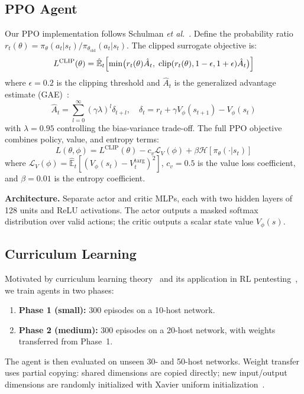 \documentclass[conference]{IEEEtran}
\begin{document}
\subsection{PPO Agent}
\label{sec:ppo}

Our PPO implementation follows Schulman \emph{et al.}~\cite{schulman2017ppo}.
Define the probability ratio $r_t(\theta) = \pi_\theta(a_t|s_t) /
\pi_{\theta_\text{old}}(a_t|s_t)$.  The clipped surrogate objective is:
\begin{equation}
  L^{\text{CLIP}}(\theta) = \hat{\mathbb{E}}_t \Bigl[
    \min\bigl(r_t(\theta)\hat{A}_t,\;
    \text{clip}(r_t(\theta), 1-\epsilon, 1+\epsilon)\hat{A}_t\bigr)
  \Bigr]
  \label{eq:ppo_clip}
\end{equation}
where $\epsilon = 0.2$ is the clipping threshold and $\hat{A}_t$ is
the generalized advantage estimate (GAE)~\cite{schulman2016gae}:
\begin{equation}
  \hat{A}_t = \sum_{l=0}^{\infty}(\gamma\lambda)^l \delta_{t+l},
  \quad
  \delta_t = r_t + \gamma V_\phi(s_{t+1}) - V_\phi(s_t)
  \label{eq:gae}
\end{equation}
with $\lambda = 0.95$ controlling the bias-variance trade-off.
The full PPO objective combines policy, value, and entropy terms:
\begin{equation}
  L(\theta, \phi) = L^{\text{CLIP}}(\theta) - c_v \mathcal{L}_V(\phi)
  + \beta \mathcal{H}[\pi_\theta(\cdot|s_t)]
  \label{eq:ppo_full}
\end{equation}
where $\mathcal{L}_V(\phi) = \hat{\mathbb{E}}_t[(V_\phi(s_t) -
V_t^{\text{targ}})^2]$, $c_v = 0.5$ is the value loss coefficient,
and $\beta = 0.01$ is the entropy coefficient.

\textbf{Architecture.}  Separate actor and critic MLPs, each with
two hidden layers of 128 units and ReLU activations.  The actor
outputs a masked softmax distribution over valid actions; the critic
outputs a scalar state value $V_\phi(s)$.

\subsection{Curriculum Learning}
\label{sec:curriculum}

Motivated by curriculum learning theory~\cite{bengio2009curriculum}
and its application in RL pentesting~\cite{nguyen2025cose,terranova2024raid},
we train agents in two phases:
\begin{enumerate}[noitemsep]
  \item \textbf{Phase 1 (small):}  300 episodes on a 10-host network.
  \item \textbf{Phase 2 (medium):}  300 episodes on a 20-host network,
        with weights transferred from Phase~1.
\end{enumerate}
The agent is then evaluated on unseen 30- and 50-host networks.
Weight transfer uses partial copying: shared dimensions are copied
directly; new input/output dimensions are randomly initialized with
Xavier uniform initialization~\cite{glorot2010init}.
\end{document}
